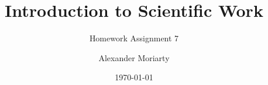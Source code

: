 \documentclass[ngerman,hyperref={pdfpagelabels=false}]{beamer}
\title{Introduction to Scientific Work}
\subtitle{Homework Assignment 7}
\author{Alexander Moriarty}
\institute[Bonn-Rhine-Sieg University of Applied Sciences]{Bonn-Rhine-Sieg University of Applied Sciences}
\date{\today}
\begin{document}
\begin{frame}
    \titlepage
\end{frame}
\begin{frame}
    \tableofcontents
\end{frame}


\end{document}
